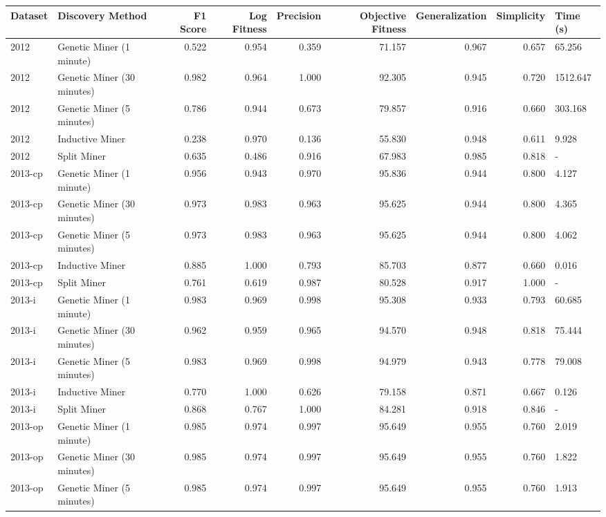 \begin{tabular}{llrrrrrrl}
\toprule
Dataset & Discovery Method & F1 Score & Log Fitness & Precision & Objective Fitness & Generalization & Simplicity & Time (s) \\
\midrule
2012 & Genetic Miner (1 minute) & 0.522 & 0.954 & 0.359 & 71.157 & 0.967 & 0.657 & 65.256 \\
2012 & Genetic Miner (30 minutes) & 0.982 & 0.964 & 1.000 & 92.305 & 0.945 & 0.720 & 1512.647 \\
2012 & Genetic Miner (5 minutes) & 0.786 & 0.944 & 0.673 & 79.857 & 0.916 & 0.660 & 303.168 \\
2012 & Inductive Miner & 0.238 & 0.970 & 0.136 & 55.830 & 0.948 & 0.611 & 9.928 \\
2012 & Split Miner & 0.635 & 0.486 & 0.916 & 67.983 & 0.985 & 0.818 & - \\
2013-cp & Genetic Miner (1 minute) & 0.956 & 0.943 & 0.970 & 95.836 & 0.944 & 0.800 & 4.127 \\
2013-cp & Genetic Miner (30 minutes) & 0.973 & 0.983 & 0.963 & 95.625 & 0.944 & 0.800 & 4.365 \\
2013-cp & Genetic Miner (5 minutes) & 0.973 & 0.983 & 0.963 & 95.625 & 0.944 & 0.800 & 4.062 \\
2013-cp & Inductive Miner & 0.885 & 1.000 & 0.793 & 85.703 & 0.877 & 0.660 & 0.016 \\
2013-cp & Split Miner & 0.761 & 0.619 & 0.987 & 80.528 & 0.917 & 1.000 & - \\
2013-i & Genetic Miner (1 minute) & 0.983 & 0.969 & 0.998 & 95.308 & 0.933 & 0.793 & 60.685 \\
2013-i & Genetic Miner (30 minutes) & 0.962 & 0.959 & 0.965 & 94.570 & 0.948 & 0.818 & 75.444 \\
2013-i & Genetic Miner (5 minutes) & 0.983 & 0.969 & 0.998 & 94.979 & 0.943 & 0.778 & 79.008 \\
2013-i & Inductive Miner & 0.770 & 1.000 & 0.626 & 79.158 & 0.871 & 0.667 & 0.126 \\
2013-i & Split Miner & 0.868 & 0.767 & 1.000 & 84.281 & 0.918 & 0.846 & - \\
2013-op & Genetic Miner (1 minute) & 0.985 & 0.974 & 0.997 & 95.649 & 0.955 & 0.760 & 2.019 \\
2013-op & Genetic Miner (30 minutes) & 0.985 & 0.974 & 0.997 & 95.649 & 0.955 & 0.760 & 1.822 \\
2013-op & Genetic Miner (5 minutes) & 0.985 & 0.974 & 0.997 & 95.649 & 0.955 & 0.760 & 1.913 \\

\end{tabular}
